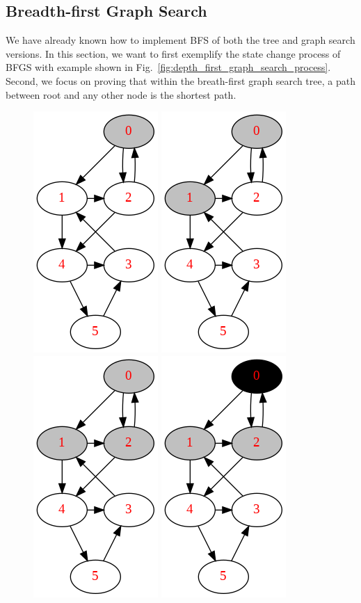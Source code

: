 \documentclass[../main.tex]{subfiles}
\begin{document}
\subsection{Breadth-first Graph Search}
We have already known how to implement BFS of both the tree and graph search versions. In this section, we want to first exemplify the state change process of BFGS with example shown in Fig.~\ref{fig:depth_first_graph_search_process}. Second, we focus on proving that within the breath-first graph search tree, a path between root and any other node is the shortest path. 

\begin{figure}[!ht]
    \centering
    \includegraphics[width=0.2\columnwidth]{fig/breath_first_graph_search_process0.png}
    \includegraphics[width=0.2\columnwidth]{fig/breath_first_graph_search_process1.png}
    \includegraphics[width=0.2\columnwidth]{fig/breath_first_graph_search_process2.png}
    \includegraphics[width=0.2\columnwidth]{fig/breath_first_graph_search_process3.png}
    

\end{figure}
\end{document}
